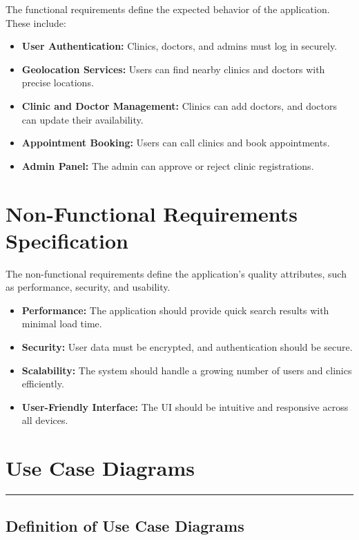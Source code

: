 \documentclass[12pt]{report}
\begin{document}
\noindent The functional requirements define the expected behavior of the application. These include:

\begin{itemize}
	\item \textbf{User Authentication:} Clinics, doctors, and admins must log in securely.
	\item \textbf{Geolocation Services:} Users can find nearby clinics and doctors with precise locations.
	\item \textbf{Clinic and Doctor Management:} Clinics can add doctors, and doctors can update their availability.
	\item \textbf{Appointment Booking:} Users can call clinics and book appointments.
	\item \textbf{Admin Panel:} The admin can approve or reject clinic registrations.
\end{itemize}

\section{\textbf{Non-Functional Requirements Specification}}

\noindent The non-functional requirements define the application's quality attributes, such as performance, security, and usability.

\begin{itemize}
	\item \textbf{Performance:} The application should provide quick search results with minimal load time.
	\item \textbf{Security:} User data must be encrypted, and authentication should be secure.
	\item \textbf{Scalability:} The system should handle a growing number of users and clinics efficiently.
	\item \textbf{User-Friendly Interface:} The UI should be intuitive and responsive across all devices.
\end{itemize}

\section{\textbf{Use Case Diagrams}}
\rule{0.45\linewidth}{0.7pt}
\subsection{\textbf{Definition of Use Case Diagrams}}
\end{document}
